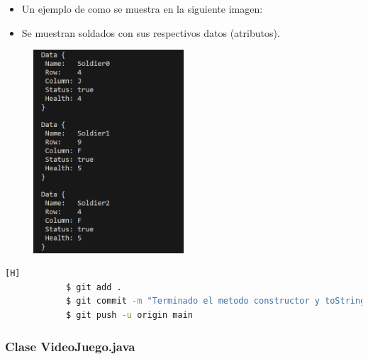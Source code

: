 \documentclass{article}
\begin{document}
        

        \begin{itemize}
            \begin{itemize}
                \item Un ejemplo de como se muestra en la siguiente imagen:
                \item Se muestran soldados con sus respectivos datos (atributos).
            \end{itemize}
        \end{itemize}

        \begin{figure}[H]
            \centering
            \includegraphics[width=0.5\textwidth,keepaspectratio]{img/toString.png}
            \caption{}
        \end{figure}

        
        \begin{lstlisting}[language=bash,caption={Commit: El último commit de la clase Soldado.java que concluía con el método toString()}][H]
    		$ git add .
    		$ git commit -m "Terminado el metodo constructor y toString."			
    		$ git push -u origin main
    	\end{lstlisting}
     
        
        \subsubsection{Clase VideoJuego.java}
\end{document}
